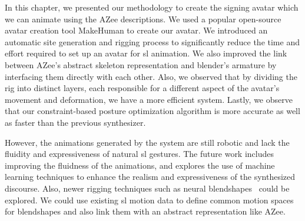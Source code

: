 \documentclass[../../main.tex]{subfiles}
\begin{document}
In this chapter, we presented our methodology to create the signing avatar which we can animate using the AZee descriptions. We used a popular open-source avatar creation tool MakeHuman to create our avatar. We introduced an automatic site generation and rigging process to significantly reduce the time and effort required to set up an avatar for \gls{sl} animation. We also improved the link between AZee's abstract skeleton representation and blender's armature by interfacing them directly with each other. Also, we observed that by dividing the rig into distinct layers, each responsible for a different aspect of the avatar's movement and deformation, we have a more efficient system. Lastly, we observe that our constraint-based posture optimization algorithm is more accurate as well as faster than the previous synthesizer.

However, the animations generated by the system are still robotic and lack the fluidity and expressiveness of natural \gls{sl} gestures. The future work includes improving the fluidness of the animations, and explores the use of machine learning techniques to enhance the realism and expressiveness of the synthesized discourse. Also, newer rigging techniques such as neural blendshapes~\cite{li2021learning} could be explored. We could use existing \gls{sl} motion data to define common motion spaces for blendshapes and also link them with an abstract representation like AZee.
\end{document}
